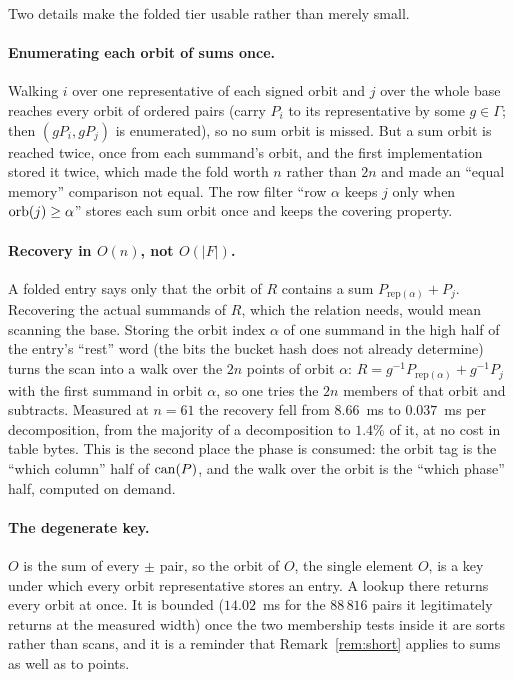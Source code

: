 Two details make the folded tier usable rather than merely small.

\paragraph{Enumerating each orbit of sums once.}
Walking $i$ over one representative of each signed orbit and $j$ over
the whole base reaches every orbit of ordered pairs (carry $P_i$ to
its representative by some $g\in\Gamma$; then $(gP_i,gP_j)$ is
enumerated), so no sum orbit is missed. But a sum orbit is reached
twice, once from each summand's orbit, and the first implementation
stored it twice, which made the fold worth $n$ rather than $2n$ and
made an ``equal memory'' comparison not equal. The row filter
``row $\alpha$ keeps $j$ only when $\operatorname{orb}(j)\ge\alpha$'' stores each sum
orbit once and keeps the covering
property.

\paragraph{Recovery in $O(n)$, not $O(|F|)$.}
A folded entry says only that the orbit of $R$ contains a sum
$P_{\mathrm{rep}(\alpha)}+P_j$. Recovering the actual summands of $R$,
which the relation needs, would mean scanning the base. Storing the
orbit index $\alpha$ of one summand in the high half of the entry's
``rest'' word (the bits the bucket hash does not already determine)
turns the scan into a walk over the $2n$ points of orbit $\alpha$:
$R=g^{-1}P_{\mathrm{rep}(\alpha)}+g^{-1}P_j$ with the first summand in
orbit $\alpha$, so one tries the $2n$ members of that orbit and
subtracts. Measured at $n=61$ the recovery fell from $8.66$~ms to
$0.037$~ms per decomposition, from the majority of a decomposition to
$1.4\%$ of it, at no cost in table
bytes.
This is the second place the phase is consumed: the orbit tag is the
``which column'' half of $\operatorname{can}(P)$, and the walk over the orbit is the
``which phase'' half, computed on demand.

\paragraph{The degenerate key.}
$O$ is the sum of every $\pm$ pair, so the orbit of $O$, the single
element $O$, is a key under which every orbit representative stores an
entry. A lookup there returns every orbit at once. It is bounded
($14.02$~ms for the $88\,816$ pairs it legitimately returns at the
measured width) once the two membership tests inside it are sorts
rather than scans, and it is a reminder that Remark~\ref{rem:short}
applies to sums as well as to points.
